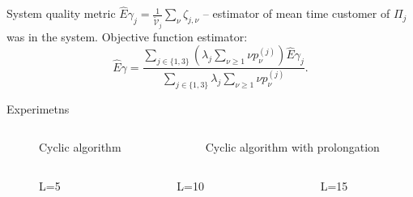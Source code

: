 \documentclass[10pt]{beamer}
\begin{document}
\begin{frame}{System quality metric}
     $\hat{E}\gamma_{j}=\frac{1}{\tilde{\mathcal{V}}_j}\sum_{\nu}\zeta_{j,\nu}$  -- estimator of mean time customer of $\Pi_j$ was in the system.
     \vfill
     Objective function estimator:
\begin{equation}
 \hat{E}\gamma=\frac{\sum_{j\in\{1,3\}} (\lambda_j \sum_{\nu\geqslant1}\nu p_{\nu}^{(j)})\hat{E}\gamma_{j} }{\sum_{j\in\{1,3\}} \lambda_j \sum_{\nu\geqslant1}\nu p_{\nu}^{(j)}}.
\end{equation}
\end{frame}


\begin{frame}[allowframebreaks]{Experimetns}
\begin{columns}
    \begin{column}{0.48\textwidth}
        \begin{figure}[h]
    \centering
    \caption{Cyclic algorithm}
    \label{VK:fig:1}
  \end{figure}
    \end{column}
    \begin{column}{0.48\textwidth}
        \begin{figure}[h]
    \centering
    \caption{Cyclic algorithm with prolongation}
    \label{VK:fig:1}
  \end{figure}
    \end{column}
\end{columns}
\framebreak

\begin{columns}
    \begin{column}{0.33\textwidth}
        \begin{figure}[h]
    \centering
    \caption{L=5}
    \label{VK:fig:1}
  \end{figure}
    \end{column}
    \begin{column}{0.33\textwidth}
        \begin{figure}[h]
    \centering
    \caption{L=10}
    \label{VK:fig:1}
  \end{figure}
    \end{column}
        \begin{column}{0.33\textwidth}
        \begin{figure}[h]
    \centering
    \caption{L=15}
    \label{VK:fig:1}
  \end{figure}
    \end{column}
\end{columns}


\end{frame}
\end{document}
